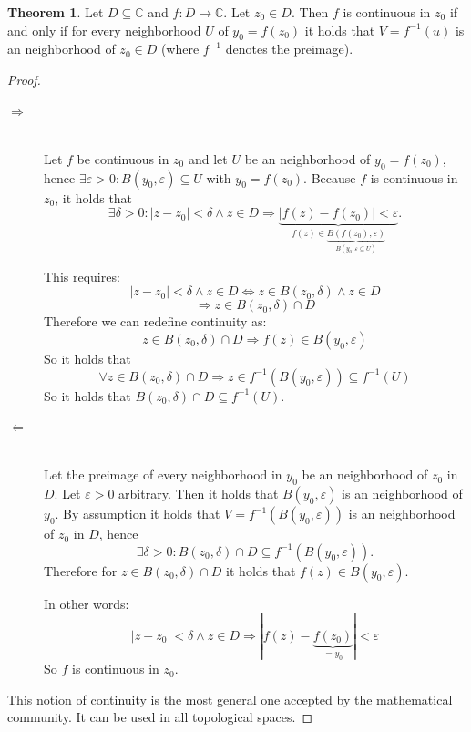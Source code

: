 \documentclass[a4paper,landscape,twocolumn]{article}
\theoremstyle{definition}
\newtheorem{theorem}{Theorem}
\newcommand\abs[1]{\left|#1\right|}
\begin{document}
\begin{theorem}
  Let $D \subseteq \mathbb C$ and $f: D \rightarrow \mathbb C$.
  Let $z_0 \in D$. Then $f$ is continuous in $z_0$
  if and only if for every neighborhood $U$ of $y_0 = f(z_0)$
  it holds that $V = f^{-1}(u)$ is an neighborhood of $z_0 \in D$
  (where $f^{-1}$ denotes the preimage).
\end{theorem}

\begin{proof}
  \begin{description}
    \item[$\Rightarrow$] \hfill{} \\
      Let $f$ be continuous in $z_0$ and let $U$ be an neighborhood
      of $y_0 = f(z_0)$, hence $\exists \varepsilon > 0: B(y_0, \varepsilon)
      \subseteq U$ with $y_0 = f(z_0)$. Because $f$ is continuous in $z_0$,
      it holds that
      \[
        \exists \delta > 0:
        \abs{z - z_0} < \delta \land z \in D \Rightarrow
        \underbrace{\abs{f(z) - f(z_0)} < \varepsilon}_{f(z) \in \underbrace{B(f(z_0), \varepsilon)}_{B(y_0, \varepsilon \subseteq U)}}.
      \]

      This requires:
      \[
        \abs{z - z_0} < \delta \land z \in D \Leftrightarrow z \in B(z_0, \delta) \land z \in D
      \]
      \[ \Rightarrow z \in B(z_0, \delta) \cap D \]
      Therefore we can redefine continuity as:
      \[ z \in B(z_0, \delta) \cap D \Rightarrow f(z) \in B(y_0, \varepsilon) \]
      So it holds that
      \[ \forall z \in B(z_0, \delta) \cap D \Rightarrow z \in f^{-1}(B(y_0, \varepsilon)) \subseteq f^{-1}(U) \]
      So it holds that $B(z_0, \delta) \cap D \subseteq f^{-1}(U)$.

    \item[$\Leftarrow$] \hfill{} \\
      Let the preimage of every neighborhood in $y_0$ be an neighborhood of $z_0$ in $D$.
      Let $\varepsilon > 0$ arbitrary. Then it holds that $B(y_0, \varepsilon)$ is an neighborhood of $y_0$.
      By assumption it holds that $V = f^{-1}(B(y_0, \varepsilon))$ is an neighborhood of $z_0$ in $D$,
      hence
      \[ \exists \delta > 0: B(z_0, \delta) \cap D \subseteq f^{-1}(B(y_0, \varepsilon)). \]
      Therefore for $z \in B(z_0, \delta) \cap D$ it holds that $f(z) \in B(y_0, \varepsilon)$.

      In other words:
      \[ \abs{z - z_0} < \delta \land z \in D \Rightarrow |f(z) - \underbrace{f(z_0)}_{= y_0}| < \varepsilon \]
      So $f$ is continuous in $z_0$.
  \end{description}
  This notion of continuity is the most general one accepted by the mathematical community.
  It can be used in all topological spaces.
\end{proof}
\end{document}
